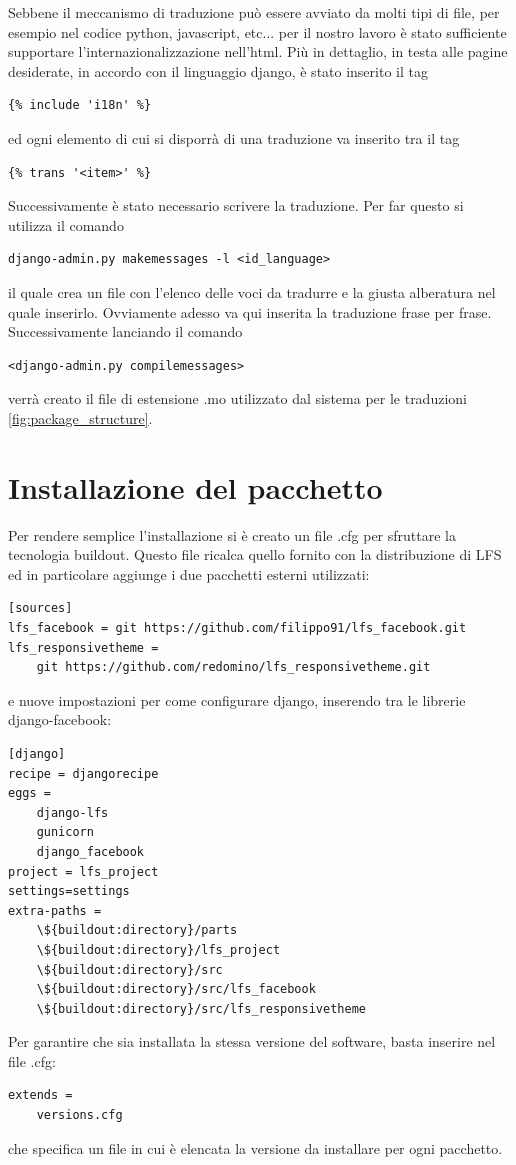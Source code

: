 Sebbene il meccanismo di traduzione può essere avviato da molti tipi di file, per esempio nel codice python, javascript, etc... per il nostro lavoro è stato sufficiente supportare l'internazionalizzazione nell'html. Più in dettaglio, in testa alle pagine desiderate, in accordo con il linguaggio django, è stato inserito  il tag
\begin{lstlisting}
{% include 'i18n' %}
\end{lstlisting}
ed ogni elemento di cui si disporrà di una traduzione va inserito tra il tag \begin{lstlisting}
{% trans '<item>' %}
\end{lstlisting}
Successivamente è stato necessario scrivere la traduzione. Per far questo si utilizza il comando
\begin{lstlisting}
django-admin.py makemessages -l <id_language>
\end{lstlisting}
il quale crea un file con l'elenco delle voci da tradurre e la giusta alberatura  nel quale inserirlo. Ovviamente adesso va qui inserita la traduzione frase per frase. Successivamente lanciando il comando 
\begin{lstlisting}
<django-admin.py compilemessages>
\end{lstlisting}
verrà creato il file di estensione .mo utilizzato dal sistema per le traduzioni \ref{fig:package_structure}.

\section{Installazione del pacchetto}
Per rendere semplice l'installazione si è creato un file .cfg per sfruttare la tecnologia buildout. Questo file ricalca quello fornito con la distribuzione di LFS ed in particolare aggiunge i due pacchetti esterni utilizzati:

\begin{lstlisting}
[sources]
lfs_facebook = git https://github.com/filippo91/lfs_facebook.git
lfs_responsivetheme = 
	git https://github.com/redomino/lfs_responsivetheme.git 
\end{lstlisting}

e nuove impostazioni per come configurare django, inserendo tra le librerie django-facebook:

\begin{lstlisting}
[django]
recipe = djangorecipe
eggs =
    django-lfs
    gunicorn
    django_facebook
project = lfs_project
settings=settings
extra-paths =
    \${buildout:directory}/parts
    \${buildout:directory}/lfs_project
    \${buildout:directory}/src
    \${buildout:directory}/src/lfs_facebook
    \${buildout:directory}/src/lfs_responsivetheme
\end{lstlisting}

Per garantire che sia installata la stessa versione del software, basta inserire nel file .cfg:
\begin{lstlisting}
extends =
    versions.cfg
\end{lstlisting}
che specifica un file in cui è elencata la versione da installare per ogni pacchetto.

\endinput
